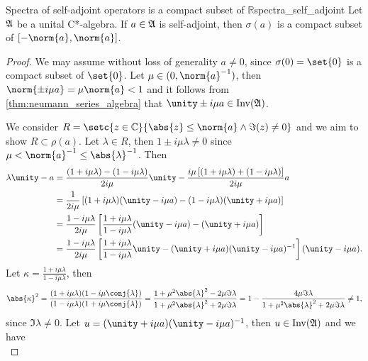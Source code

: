 \begin{theorem}{Spectra of self-adjoint operators is a compact subset of \(\mathbb{R}\)}{spectra_self_adjoint}
    Let \(\mathfrak{A}\) be a unital C*-algebra. If \(a \in \mathfrak{A}\) is self-adjoint, then \(\sigma(a)\) is a compact subset of \([-\norm{a}, \norm{a}]\).
\end{theorem}
\begin{proof}
    We may assume without loss of generality \(a\neq0\), since \(\sigma(0) = \set{0}\) is a compact subset of \(\set{0}\).
    Let \(\mu \in (0, \norm{a}^{-1})\), then \(\norm{\pm i\mu a} = \mu \norm{a} < 1\) and it follows from \cref{thm:neumann_series_algebra} that \(\unity \pm i \mu a \in \invertible{\algebra{A}}\).

    We consider \(R = \setc{z \in \mathbb{C}}{\abs{z} \leq \norm{a} \land \Im(z) \neq 0}\) and we aim to show \(R \subset \rho(a)\). Let \(\lambda \in R\), then \(1 \pm i \mu \lambda \neq 0\) since \(\mu < \norm{a}^{-1} \leq \abs{\lambda}^{-1}\). Then
    \begin{align*}
        \lambda \unity - a &= \frac{(1 + i \mu \lambda) - (1 - i \mu \lambda)}{2i \mu}\unity - \frac{i\mu\left[(1 + i\mu \lambda) + (1 - i \mu \lambda)\right]}{2i \mu} a\\
                           &= \frac{1}{2i\mu}\left[(1 + i\mu \lambda)(\unity - i\mu a) - (1 - i\mu \lambda)(\unity + i\mu a)\right]\\
                           &= \frac{1 - i\mu \lambda}{2i\mu} \left[\frac{1 + i\mu \lambda}{1 - i\mu \lambda}(\unity - i\mu a) - (\unity + i\mu a)\right]\\
                           &= \frac{1 - i\mu \lambda}{2i \mu} \left[\frac{1 + i\mu \lambda}{1 - i\mu \lambda}\unity - (\unity + i\mu a)(\unity - i\mu a)^{-1}\right](\unity - i\mu a).
    \end{align*}
    Let \(\kappa = \frac{1 + i\mu \lambda}{1 - i\mu \lambda}\), then
    \begin{equation*}
        \abs{\kappa}^2 = \frac{(1 + i\mu \lambda)(1 -i \mu \conj{\lambda})}{(1 - i\mu \lambda)(1 + i \mu \conj{\lambda})} = \frac{1 + \mu^2 \abs{\lambda}^2 - 2\mu \Im{\lambda}}{1 + \mu^2 \abs{\lambda}^2 + 2\mu \Im{\lambda}} = 1 - \frac{4\mu\Im{\lambda}}{1 + \mu^2 \abs{\lambda}^2 + 2 \mu \Im{\lambda}} \neq 1,
    \end{equation*}
    since \(\Im \lambda \neq 0\). Let \(u = (\unity + i\mu a)(\unity - i\mu a)^{-1}\), then \(u \in \operatorname{Inv}(\mathfrak{A})\) and we have
    \begin{equation*}

\end{equation*}
\end{proof}
